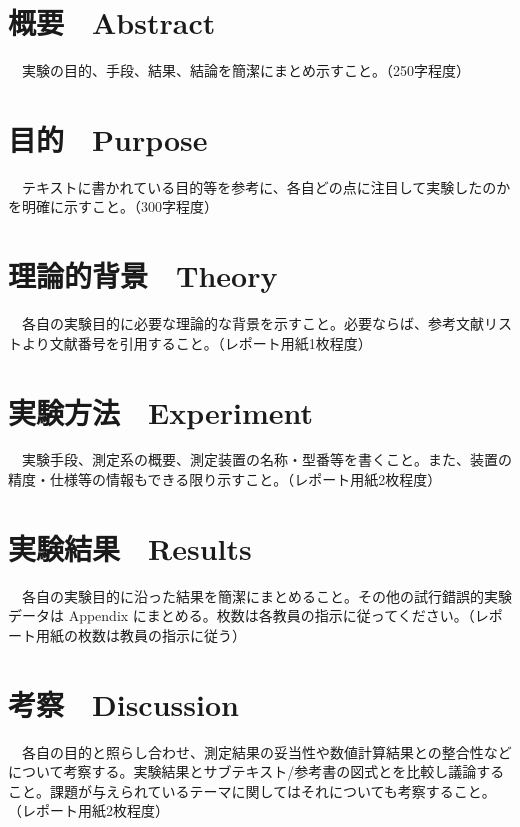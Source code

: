



\maketitle

\fontsize{11.041pt}{16.562pt}\selectfont

\section{概要　Abstract}
　実験の目的、手段、結果、結論を簡潔にまとめ示すこと。（250字程度）

\section{目的　Purpose}
　テキストに書かれている目的等を参考に、各自どの点に注目して実験したのかを明確に示すこと。（300字程度）

\section{理論的背景　Theory}
　各自の実験目的に必要な理論的な背景を示すこと。必要ならば、参考文献リストより文献番号を引用すること。（レポート用紙1枚程度）

\section{実験方法　Experiment}
　実験手段、測定系の概要、測定装置の名称・型番等を書くこと。また、装置の精度・仕様等の情報もできる限り示すこと。（レポート用紙2枚程度）

\section{実験結果　Results}
　各自の実験目的に沿った結果を簡潔にまとめること。その他の試行錯誤的実験データは Appendix にまとめる。枚数は各教員の指示に従ってください。（レポート用紙の枚数は教員の指示に従う）

\section{考察　Discussion}
　各自の目的と照らし合わせ、測定結果の妥当性や数値計算結果との整合性などについて考察する。実験結果とサブテキスト/参考書の図式とを比較し議論すること。課題が与えられているテーマに関してはそれについても考察すること。（レポート用紙2枚程度）

